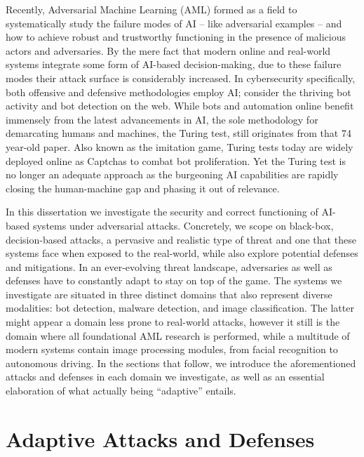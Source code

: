 Recently, Adversarial Machine Learning (\gls{AML}) formed as a field to systematically study the failure modes of AI -- like adversarial examples -- and how to achieve robust and trustworthy functioning in the presence of malicious actors and adversaries.
By the mere fact that modern online and real-world systems integrate some form of AI-based decision-making, due to these failure modes their attack surface is considerably increased.
In cybersecurity specifically, both offensive and defensive methodologies employ AI; consider the thriving bot activity and bot detection on the web.
While bots and automation online benefit immensely from the latest advancements in AI, the sole methodology for demarcating humans and machines, the Turing test, still originates from that 74 year-old paper.
Also known as the imitation game, Turing tests today are widely deployed online as Captchas to combat bot proliferation.
Yet the Turing test is no longer an adequate approach as the burgeoning \gls{AI} capabilities are rapidly closing the human-machine gap and phasing it out of relevance.

In this dissertation we investigate the security and correct functioning of AI-based systems under adversarial attacks.
Concretely, we scope on black-box, decision-based attacks, a pervasive and realistic type of threat and one that these systems face when exposed to the real-world, while also explore potential defenses and mitigations.
In an ever-evolving threat landscape, adversaries as well as defenses have to constantly adapt to stay on top of the game.
The systems we investigate are situated in three distinct domains that also represent diverse modalities: bot detection, malware detection, and image classification.
The latter might appear a domain less prone to real-world attacks, however it still is the domain where all foundational \gls{AML} research is performed, while a multitude of modern systems contain image processing modules, from facial recognition to autonomous driving.
In the sections that follow, we introduce the aforementioned attacks and defenses in each domain we investigate, as well as an essential elaboration of what actually being ``adaptive'' entails.

\section{Adaptive Attacks and Defenses}

